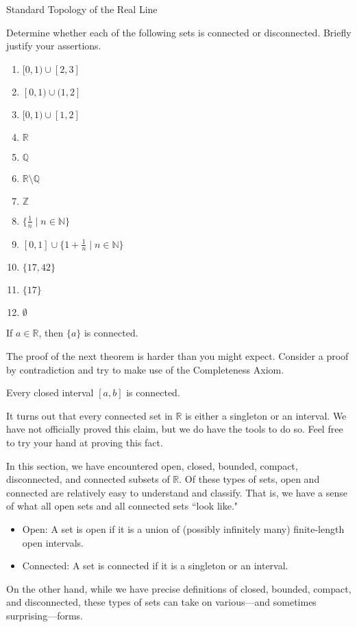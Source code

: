 \begin{section}{Standard Topology of the Real Line}
\begin{problem}
Determine whether each of the following sets is connected or disconnected.  Briefly justify your assertions.
\begin{multicols}{2}
\begin{enumerate}[label=\textrm{(\alph*)}]
\item $[0,1)\cup [2,3]$
\item $[0,1)\cup (1,2]$
\item $[0,1)\cup [1,2]$
\item $\mathbb{R}$
\item $\mathbb{Q}$
\item $\mathbb{R}\setminus\mathbb{Q}$
\item $\mathbb{Z}$
\item $\{\frac{1}{n}\mid n\in\mathbb{N}\}$
\item $[0,1]\cup\{1+\frac{1}{n}\mid n\in\mathbb{N}\}$
\item $\{17,42\}$
\item $\{17\}$
\item $\emptyset$
\end{enumerate}
\end{multicols}
\end{problem}

\begin{theorem}
If $a\in\mathbb{R}$, then $\{a\}$ is connected.
\end{theorem}

The proof of the next theorem is harder than you might expect. Consider a proof by contradiction and try to make use of the Completeness Axiom.

\begin{theorem}\label{thm:closed interval connected}
Every closed interval $[a,b]$ is connected.
\end{theorem}

It turns out that every connected set in $\mathbb{R}$ is either a singleton or an interval. We have not officially proved this claim, but we do have the tools to do so. Feel free to try your hand at proving this fact.

In this section, we have encountered open, closed, bounded, compact, disconnected, and connected subsets of $\mathbb{R}$. Of these types of sets, open and connected are relatively easy to understand and classify. That is, we have a sense of what all open sets and all connected sets ``look like."
\begin{itemize}
\item Open: A set is open if it is a union of (possibly infinitely many) finite-length open intervals.
\item Connected: A set is connected if it is a singleton or an interval.
\end{itemize}
On the other hand, while we have precise definitions of closed, bounded, compact, and disconnected, these types of sets can take on various---and sometimes surprising---forms.



\end{section}